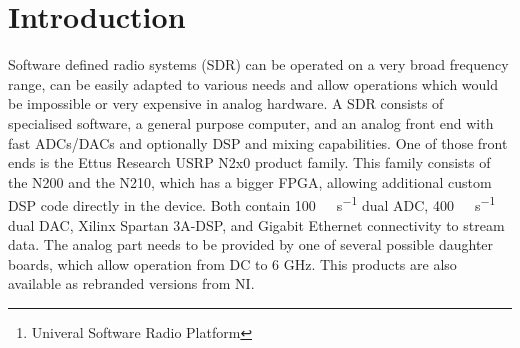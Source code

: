 \documentclass[12pt,a4paper,parskip=full]{scrartcl}
\begin{document}
\tableofcontents

\begin{abstract}
    The low cost Ettus Research USRP\footnote{Univeral Software Radio Platform} 
    combined with GNURadio enables implementing cheap and simple radio solutions.
    This allows rapid prototyping of new radio protocols, easier test setups for
    lab purposes and even reconstructing old analog communications hardware on a
    budget. Although Ettus Research provides schematics, source code, and documentation,
    there is no data available on the RF characteristics of the USRP devices.
\end{abstract}

\section{Introduction}
Software defined radio systems (SDR) can be operated on a very broad frequency range,
can be easily adapted to various needs and allow operations which would be
impossible or very expensive in analog hardware. A SDR consists of specialised
software, a general purpose computer, and an analog front end with fast
ADCs/DACs and optionally DSP and mixing capabilities. One of those front ends is
the Ettus Research USRP N2x0 product family. This family consists of the N200 and
the N210, which has a bigger FPGA, allowing additional custom DSP code directly
in the device. Both contain \SI{100}{\mega\samples\per\second} dual ADC,
\SI{400}{\mega\samples\per\second} dual DAC, Xilinx Spartan
3A-DSP, and Gigabit Ethernet connectivity to stream data. The analog part needs
to be provided by one of several possible daughter boards, which allow operation
from DC to 6 GHz\cite{ettus_n2x0}. This products are also available as rebranded
versions from NI.
\end{document}

